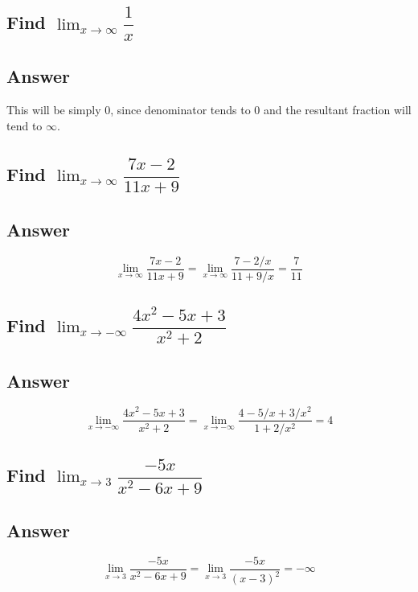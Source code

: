 \documentclass[11pt]{article}
\begin{document}
\vspace{2em}

\subsection{Find $\displaystyle \lim_{x\to \infty} \dfrac{1}{x}$}

\subsection*{Answer}

This will be simply 0, since denominator tends to 0 and the resultant fraction will tend to $\infty$.

\vspace{2em}

\subsection{Find $\displaystyle \lim_{x\to \infty} \dfrac{7x - 2}{11x + 9}$}

\subsection*{Answer}

\[
\lim_{x\to \infty} \dfrac{7x - 2}{11x + 9} = \lim_{x\to \infty} \dfrac{7 - 2/x}{11 + 9/x} = \dfrac{7}{11}
\]

\vspace{2em}

\subsection{Find $\displaystyle \lim_{x\to -\infty} \dfrac{4x^2 - 5x + 3}{x^2 + 2}$}

\subsection*{Answer}

\[
\lim_{x\to -\infty} \dfrac{4x^2 - 5x + 3}{x^2 + 2} = \lim_{x\to -\infty} \dfrac{4 - 5/x + 3/x^2}{1 + 2/x^2} = 4
\]

\vspace{2em}

\subsection{Find $\displaystyle \lim_{x\to 3} \dfrac{-5x}{x^2 - 6x + 9}$}
\subsection*{Answer}
\[
\lim_{x\to 3} \dfrac{-5x}{x^2 - 6x + 9} = \lim_{x\to 3} \dfrac{-5x}{(x - 3)^2} = -\infty
\]
\end{document}
